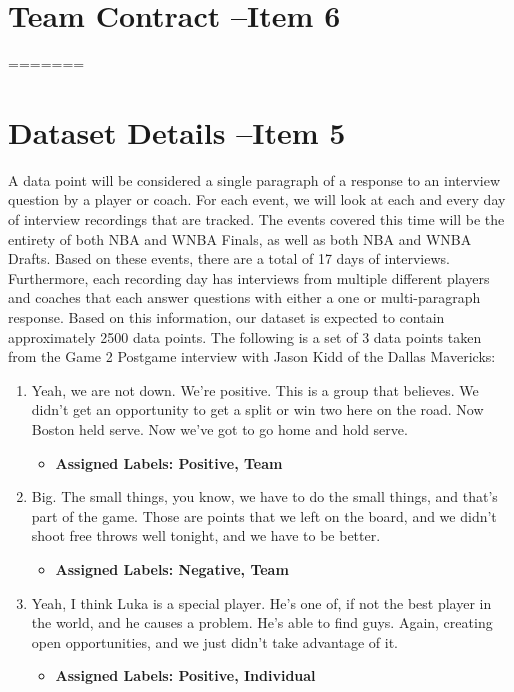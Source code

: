\documentclass[titlepage]{article}
\begin{document}
\section{Team Contract --Item 6}
=======

\section{Dataset Details --Item 5}
\indent A data point will be considered a single paragraph of a
response to an interview question by a player or coach.
For each event, we will look at each and every day of interview
recordings that are tracked. The events covered
this time will be the entirety of both NBA and WNBA Finals, as well
as both NBA and WNBA Drafts. Based on these
events, there are a total of 17 days of interviews. Furthermore, each
recording day has interviews from multiple
different players and coaches that each answer questions with either
a one or multi-paragraph response. Based on
this information, our dataset is expected to contain approximately
2500 data points.
\newline \newline
\indent The following is a set of 3 data points taken from the Game 2
Postgame interview with Jason Kidd of the Dallas
Mavericks:
\begin{enumerate}
  \item Yeah, we are not down. We're positive. This is a group that
    believes. We didn't get an opportunity to get a
    split or win two here on the road. Now Boston held serve. Now
    we've got to go home and hold serve.
    \begin{itemize}
      \item \textbf{Assigned Labels: Positive, Team}
    \end{itemize}

  \item Big. The small things, you know, we have to do the small
    things, and that's part of the game. Those are points
    that we left on the board, and we didn't shoot free throws well
    tonight, and we have to be better.
    \begin{itemize}
      \item \textbf{Assigned Labels: Negative, Team}
    \end{itemize}

  \item Yeah, I think Luka is a special player. He's one of, if not
    the best player in the world, and he causes a problem.
    He's able to find guys. Again, creating open opportunities, and
    we just didn't take advantage of it.
    \begin{itemize}
      \item \textbf{Assigned Labels: Positive, Individual}
    \end{itemize}
\end{enumerate}
\end{document}
